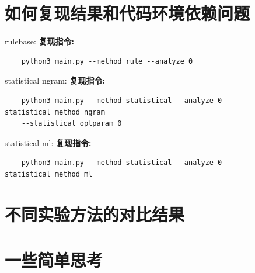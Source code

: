 \documentclass[answers]{exam}  %
\begin{document}
\section{如何复现结果和代码环境依赖问题}

rulebase:
\textbf{复现指令:}
\begin{lstlisting}
    python3 main.py --method rule --analyze 0  
\end{lstlisting}

statistical ngram:
\textbf{复现指令:}
\begin{lstlisting}
    python3 main.py --method statistical --analyze 0 --statistical_method ngram 
    --statistical_optparam 0
\end{lstlisting}

statistical ml:
\textbf{复现指令:}
\begin{lstlisting}
    python3 main.py --method statistical --analyze 0 --statistical_method ml 
\end{lstlisting}



\section{不同实验方法的对比结果}

\section{一些简单思考}
\end{document}
